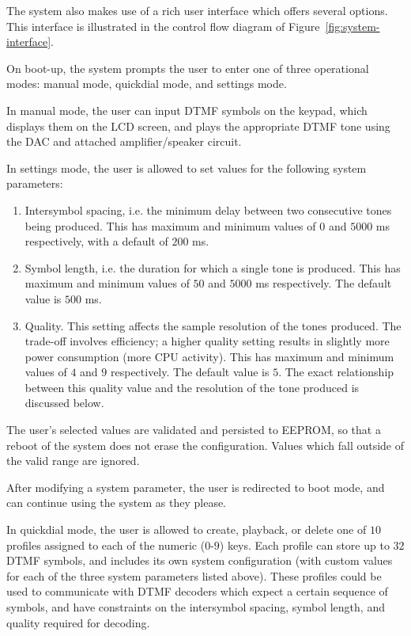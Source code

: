 \documentclass[11pt,a4paper,twocolumn]{scrartcl}
\begin{document}
   The system also makes use of a rich user interface which offers several options. This interface is illustrated in the control flow diagram of Figure~\ref{fig:system-interface}.

   On boot-up, the system prompts the user to enter one of three operational modes: manual mode, quickdial mode, and settings mode.

   In manual mode, the user can input DTMF symbols on the keypad, which displays them on the LCD screen, and plays the appropriate DTMF tone using the DAC and attached amplifier/speaker circuit.

   In settings mode, the user is allowed to set values for the following system parameters:
   \begin{enumerate}
      \item Intersymbol spacing, i.e. the minimum delay between two consecutive tones being produced. This has maximum and minimum values of $0$ and $5000$ ms respectively, with a default of $200$ ms.
      \item Symbol length, i.e. the duration for which a single tone is produced. This has maximum and minimum values of $50$ and $5000$ ms respectively. The default value is $500$ ms.
      \item Quality. This setting affects the sample resolution of the tones produced. The trade-off involves efficiency; a higher quality setting results in slightly more power consumption (more CPU activity). This has maximum and minimum values of $4$ and $9$ respectively. The default value is $5$. The exact relationship between this quality value and the resolution of the tone produced is discussed below.
   \end{enumerate}

   The user's selected values are validated and persisted to EEPROM, so that a reboot of the system does not erase the configuration. Values which fall outside of the valid range are ignored.

   After modifying a system parameter, the user is redirected to boot mode, and can continue using the system as they please.

   In quickdial mode, the user is allowed to create, playback, or delete one of $10$ profiles assigned to each of the numeric ($0$-$9$) keys. Each profile can store up to $32$ DTMF symbols, and includes its own system configuration (with custom values for each of the three system parameters listed above). These profiles could be used to communicate with DTMF decoders which expect a certain sequence of symbols, and have constraints on the intersymbol spacing, symbol length, and quality required for decoding.
\end{document}
